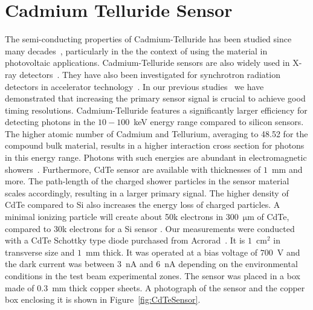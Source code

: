 %
%
%
\section{Cadmium Telluride Sensor}
\label{sec:siliconpad}
The semi-conducting properties of Cadmium-Telluride has been studied since many decades~\cite{cdtegeneric}, 
particularly in the the context of using the material in photovoltaic applications.
Cadmium-Telluride sensors are also widely used in X-ray detectors~\cite{cdtesensorsgeneric,cdtesensors2,cdtesensors3}. 
They have also been investigated for synchrotron radiation detectors in accelerator technology~\cite{cdtelhc}.   
In our previous 
studies~\cite{Anderson:2015gha,MCPShowerMaxPaper,Ronzhin201552,SiliconTiming,PixelatedMCP,Anderson:2016ygg,Anderson:2015tia} 
we have demonstrated that increasing the primary sensor signal is crucial to achieve good timing resolutions.  
Cadmium-Telluride features a significantly larger efficiency for detecting photons in the $10-100$~keV energy range 
compared to silicon sensors. The higher atomic number of Cadmium and Tellurium, averaging to 48.52 for the 
compound bulk material, results in a higher interaction cross section for photons in this energy range. 
Photons with such energies are abundant in electromagnetic showers~\cite{showercomposition}. 
Furthermore, CdTe sensor are available with thicknesses of $1$~mm and more. 
The path-length of the charged shower particles in the sensor material scales accordingly, 
resulting in a larger primary signal. The higher density of CdTe compared to Si also increases the energy loss of charged particles. A minimal ionizing particle will create about 50k electrons in 300~$\mathrm{\mu}$m of CdTe, compared to 30k electrons for a Si sensor \cite{cdtelhc2}.
%
Our measurements were conducted with a CdTe Schottky type diode purchased from 
Acrorad~\cite{acrorad}. It is $1$~$\mathrm{cm}^{2}$ in transverse size and $1$~mm thick.
It was operated at a bias voltage of $700$~V and the dark current was between $3$~nA 
and $6$~nA depending on the environmental conditions in the test beam experimental 
zones. The sensor was placed in a box made of $0.3$~mm thick copper sheets. A 
photograph of the sensor and the copper box enclosing it is shown in 
Figure~\ref{fig:CdTeSensor}.

